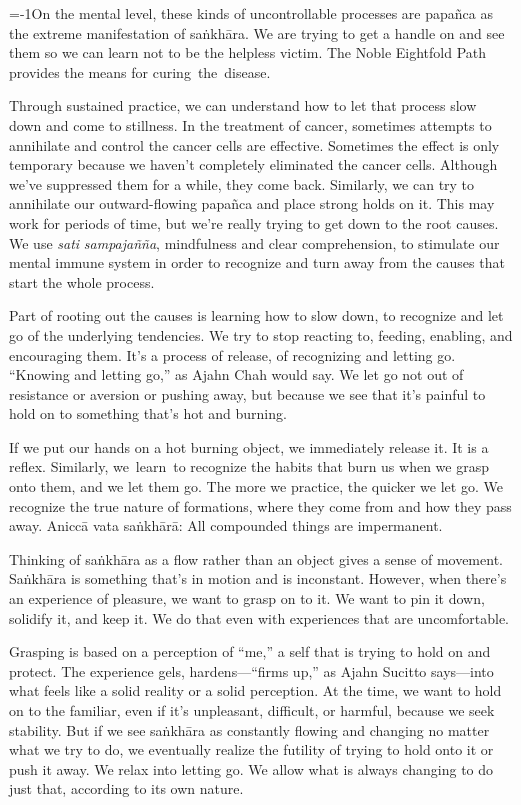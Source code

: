 \looseness=-1On the mental level, these kinds of uncontrollable processes are papañca as the extreme manifestation of saṅkhāra. We are trying to get a handle on and \linebreak see them so we can learn not to be the helpless victim. The Noble Eightfold Path provides the means for \mbox{curing the disease.}

Through sustained practice, we can understand how to let that process slow down and come to stillness. In the treatment of cancer, sometimes attempts to annihilate and control the cancer cells are effective. Sometimes the effect is only temporary because we haven't completely eliminated the cancer cells. Although we've suppressed them for a while, they come back. Similarly, we can try to annihilate our outward-flowing papañca and place strong holds on it. This may work for periods of time, but we're really trying to get down to the root causes. We use \emph{sati} \emph{sampajañña}, mindfulness and clear comprehension, to stimulate our mental immune system in order to recognize and turn away from the causes that start the whole process.

Part of rooting out the causes is learning how to slow down, to recognize and let go of the underlying tendencies. We try to stop reacting to, feeding, enabling, and encouraging them. It's a process of release, of recognizing and letting go. ``Knowing and letting go,'' as Ajahn Chah would say. We let go not out of resistance or aversion or pushing away, but because we see that it's painful to hold on to something that's hot and burning.

If we put our hands on a hot burning object, we immediately release it. It is a reflex. Similarly, \mbox{we learn to} recognize the habits that burn us when we grasp onto them, and we let them go. The more we practice, the quicker we let go. We recognize the true nature of formations, where they come from and how they pass away. Aniccā vata saṅkhārā: All compounded things are impermanent.

Thinking of saṅkhāra as a flow rather than an object gives a sense of movement. Saṅkhāra is something that's in motion and is inconstant. However, when there's an experience of pleasure, we want to grasp on to it. We want to pin it down, solidify it, and keep it. We do that even with experiences that are uncomfortable.

Grasping is based on a perception of ``me,'' a self that is trying to hold on and protect. The experience gels, hardens---``firms up,'' as Ajahn Sucitto says---into what feels like a solid reality or a solid perception. At the time, we want to hold on to the familiar, even if it's unpleasant, difficult, or harmful, because we seek stability. But if we see saṅkhāra as constantly flowing and changing no matter what we try to do, we eventually realize the futility of trying to hold onto it or push it away. We relax into letting go. We allow what is always changing to do just that, according to its own nature.

